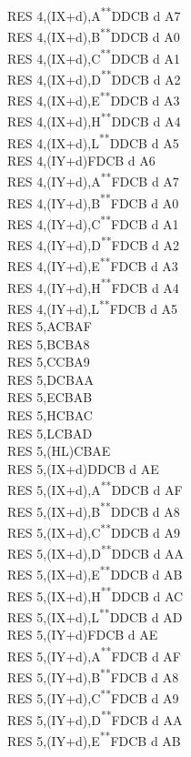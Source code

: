 \documentclass[12pt,twoside,openright,a4paper]{book}
\newcommand{\UNDOC}{\textnormal{\textsuperscript{**}}}
\begin{document}
\begin{multicols}{3}
{\begin{tabbing}
		RES 4,(IX+d),A\UNDOC\>DDCB d A7\\
		RES 4,(IX+d),B\UNDOC\>DDCB d A0\\
		RES 4,(IX+d),C\UNDOC\>DDCB d A1\\
		RES 4,(IX+d),D\UNDOC\>DDCB d A2\\
		RES 4,(IX+d),E\UNDOC\>DDCB d A3\\
		RES 4,(IX+d),H\UNDOC\>DDCB d A4\\
		RES 4,(IX+d),L\UNDOC\>DDCB d A5\\
		RES 4,(IY+d)\>FDCB d A6\\
		RES 4,(IY+d),A\UNDOC\>FDCB d A7\\
		RES 4,(IY+d),B\UNDOC\>FDCB d A0\\
		RES 4,(IY+d),C\UNDOC\>FDCB d A1\\
		RES 4,(IY+d),D\UNDOC\>FDCB d A2\\
		RES 4,(IY+d),E\UNDOC\>FDCB d A3\\
		RES 4,(IY+d),H\UNDOC\>FDCB d A4\\
		RES 4,(IY+d),L\UNDOC\>FDCB d A5\\
		RES 5,A\>CBAF\\
		RES 5,B\>CBA8\\
		RES 5,C\>CBA9\\
		RES 5,D\>CBAA\\
		RES 5,E\>CBAB\\
		RES 5,H\>CBAC\\
		RES 5,L\>CBAD\\
		RES 5,(HL)\>CBAE\\
		RES 5,(IX+d)\>DDCB d AE\\
		RES 5,(IX+d),A\UNDOC\>DDCB d AF\\
		RES 5,(IX+d),B\UNDOC\>DDCB d A8\\
		RES 5,(IX+d),C\UNDOC\>DDCB d A9\\
		RES 5,(IX+d),D\UNDOC\>DDCB d AA\\
		RES 5,(IX+d),E\UNDOC\>DDCB d AB\\
		RES 5,(IX+d),H\UNDOC\>DDCB d AC\\
		RES 5,(IX+d),L\UNDOC\>DDCB d AD\\
		RES 5,(IY+d)\>FDCB d AE\\
		RES 5,(IY+d),A\UNDOC\>FDCB d AF\\
		RES 5,(IY+d),B\UNDOC\>FDCB d A8\\
		RES 5,(IY+d),C\UNDOC\>FDCB d A9\\
		RES 5,(IY+d),D\UNDOC\>FDCB d AA\\
		RES 5,(IY+d),E\UNDOC\>FDCB d AB\\

\end{tabbing}}
\end{multicols}
\end{document}
